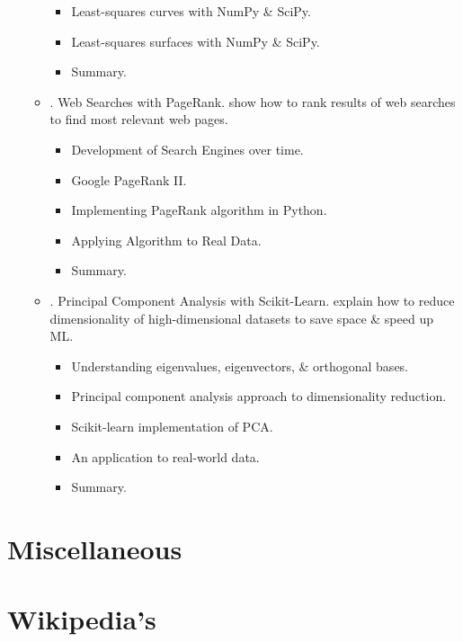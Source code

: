 \documentclass{article}
\begin{document}
\begin{enumerate}
\begin{itemize}
\begin{itemize}
			\item {\sf Least-squares curves with NumPy \& SciPy.}
			\item {\sf Least-squares surfaces with NumPy \& SciPy.}
			\item {\sf Summary.}
		\end{itemize}
		\item {. Web Searches with PageRank.} show how to rank results of web searches to find most relevant web pages.
		\begin{itemize}
			\item {\sf Development of Search Engines over time.}
			\item {\sf Google PageRank II.}
			\item {\sf Implementing PageRank algorithm in Python.}
			\item {\sf Applying Algorithm to Real Data.}
			\item {\sf Summary.}
		\end{itemize}
		\item {. Principal Component Analysis with Scikit-Learn.} explain how to reduce dimensionality of high-dimensional datasets to save space \& speed up ML.
		\begin{itemize}
			\item {\sf Understanding eigenvalues, eigenvectors, \& orthogonal bases.}
			\item {\sf Principal component analysis approach to dimensionality reduction.}
			\item {\sf Scikit-learn implementation of PCA.}
			\item {\sf An application to real-world data.}
			\item {\sf Summary.}
		\end{itemize}
	\end{itemize}
\end{enumerate}


\section{Miscellaneous}


\section{Wikipedia's}
\end{document}
